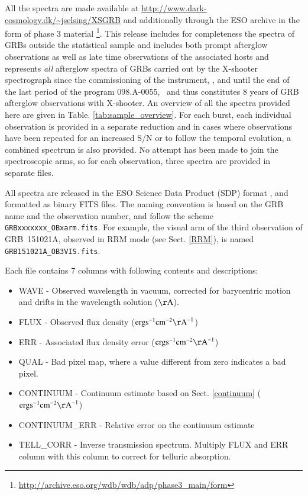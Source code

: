 \documentclass{aa}    %
\begin{document}
All the spectra are made available at
\url{http://www.dark-cosmology.dk/~jselsing/XSGRB} and additionally through the
ESO archive in the form of phase 3 material
\footnote{\url{http://archive.eso.org/wdb/wdb/adp/phase3_main/form}}. This
release includes for completeness the spectra of GRBs outside the statistical
sample and includes both prompt afterglow observations as well as late time
observations of the associated hosts and represents \textit{all} afterglow
spectra of GRBs carried out by the X-shooter spectrograph since the
commissioning of the instrument, \startdate, and until the end of the last
period of the program 098.A-0055, \termdate~and thus constitutes 8 years of GRB
afterglow observations with X-shooter. An overview of all the spectra provided
here are given in Table. \ref{tab:sample_overview}. For each burst, each
individual observation is provided in a separate reduction and in cases where
observations have been repeated for an increased S/N or to follow the temporal
evolution, a combined spectrum is also provided. No attempt has been made to
join the spectroscopic arms, so for each observation, three spectra are provided
in separate files.

All spectra are released in the ESO Science Data Product (SDP) format
\citep{Micol2016}, and formatted as binary FITS files. The naming convention is
based on the GRB name and the observation number, and follow the scheme
\texttt{GRBxxxxxxx\_OBxarm.fits}. For example, the visual arm of the third
observation of GRB~151021A, observed in RRM mode (see Sect. \ref{RRM}), is named
\texttt{GRB151021A\_OB3VIS.fits}.

Each file contains 7 columns with following contents and descriptions:
\begin{itemize}
	\item WAVE - Observed wavelength in vacuum, corrected for barycentric motion and drifts in the wavelength solution ($\mathrm{\AA}$).
	\item FLUX - Observed flux density ($\mathrm{erg} \mathrm{s}^{-1} \mathrm{cm}^{-2} \mathrm{\AA}^{-1}$)
	\item ERR - Associated flux density error ($\mathrm{erg} \mathrm{s}^{-1} \mathrm{cm}^{-2} \mathrm{\AA}^{-1}$)
	\item QUAL - Bad pixel map, where a value different from zero indicates a bad pixel.
	\item CONTINUUM - Continuum estimate based on Sect. \ref{continuum} ($\mathrm{erg} \mathrm{s}^{-1} \mathrm{cm}^{-2} \mathrm{\AA}^{-1}$)
	\item CONTINUUM\_ERR - Relative error on the continuum estimate 
	\item TELL\_CORR - Inverse transmission spectrum. Multiply FLUX and ERR column with this column to correct for telluric absorption. 
\end{itemize}
\end{document}
